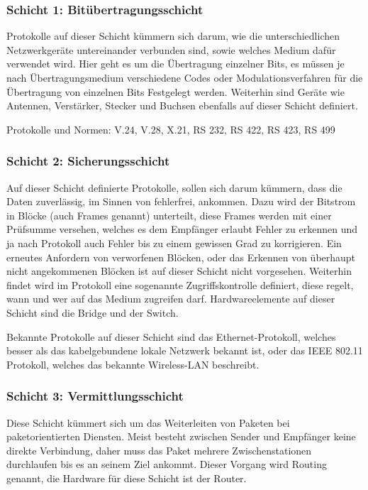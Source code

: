 \documentclass[a4paper,14pt,headsepline]{scrartcl}
\begin{document}
\subsubsection{Schicht 1: Bitübertragungsschicht}
Protokolle auf dieser Schicht kümmern sich darum, wie die unterschiedlichen Netzwerkgeräte untereinander verbunden sind, sowie welches Medium dafür verwendet wird. Hier geht es um die Übertragung einzelner Bits, es müssen je nach Übertragungsmedium verschiedene Codes oder Modulationsverfahren für die Übertragung von einzelnen Bits Festgelegt werden. Weiterhin sind Geräte wie Antennen, Verstärker, Stecker und Buchsen ebenfalls auf dieser Schicht definiert.

Protokolle und Normen: V.24, V.28, X.21, RS 232, RS 422, RS 423, RS 499

\subsubsection{Schicht 2: Sicherungsschicht}
Auf dieser Schicht definierte Protokolle, sollen sich darum kümmern, dass die Daten zuverlässig, im Sinnen von fehlerfrei, ankommen. Dazu wird der Bitstrom in Blöcke (auch Frames genannt) unterteilt, diese Frames werden mit einer Prüfsumme versehen, welches es dem Empfänger erlaubt Fehler zu erkennen und ja nach Protokoll auch Fehler bis zu einem gewissen Grad zu korrigieren. Ein erneutes Anfordern von verworfenen Blöcken, oder das Erkennen von überhaupt nicht angekommenen Blöcken ist auf dieser Schicht nicht vorgesehen. Weiterhin findet wird im Protokoll eine sogenannte Zugriffskontrolle definiert, diese regelt, wann und wer auf das Medium zugreifen darf. Hardwareelemente auf dieser Schicht sind die Bridge und der Switch.

Bekannte Protokolle auf dieser Schicht sind das Ethernet-Protokoll, welches besser als das kabelgebundene lokale Netzwerk bekannt ist, oder das IEEE 802.11 Protokoll, welches das bekannte Wireless-LAN beschreibt.

\subsubsection{Schicht 3: Vermittlungsschicht}
Diese Schicht kümmert sich um das Weiterleiten von Paketen bei paketorientierten Diensten. Meist besteht zwischen Sender und Empfänger keine direkte Verbindung, daher muss das Paket mehrere Zwischenstationen durchlaufen bis es an seinem Ziel ankommt. Dieser Vorgang wird Routing genannt, die Hardware für diese Schicht ist der Router.
\end{document}
